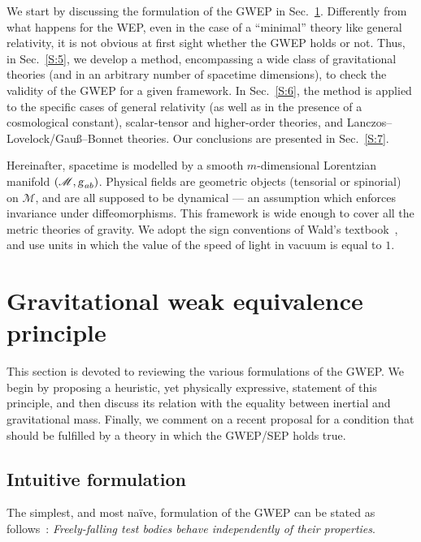 \documentclass[a4paper,showkeys,aps,prd,reprint,nofootinbib,showpacs,twocolumn]{revtex4-1}
\newcommand{\ton}[1]{\left(#1\right)}
\newcommand{\eq}[1]{\( #1 \)}
\newcommand{\Scr}[1]{\mathscr{#1}}
\newcommand{\matg}{\text{\textsl{g}}}%
\theoremstyle{plain}
\begin{document}
We start by discussing the formulation of the GWEP in Sec.~\ref{S:2}.  Differently from what happens for the WEP, even in the case of a ``minimal'' theory like general relativity, it is not obvious at first sight whether the GWEP holds or not.  Thus, in Sec.~\ref{S:5}, we develop a method, encompassing a wide class of gravitational theories (and in an arbitrary number of spacetime dimensions), to check the validity of the GWEP for a given framework.  In Sec.~\ref{S:6}, the method is applied to the specific cases of general relativity (as well as in the presence of a cosmological constant), scalar-tensor and higher-order theories, and Lanczos--Lovelock/Gau\ss{}--Bonnet theories.  Our conclusions are presented in Sec.~\ref{S:7}.

Hereinafter, spacetime is modelled by a smooth \eq{m}-dimensional  Lorentzian manifold \eq{\ton{\Scr{M} , \matg_{ab}}}.  Physical fields are geometric objects (tensorial or spinorial) on \eq{\Scr{M}}, and are all supposed to be dynamical --- an assumption which enforces invariance under diffeomorphisms.  This framework is wide enough to cover all the metric theories of gravity.  We adopt the sign conventions of Wald's textbook~\cite{Wald:1984rg}, and use units in which the value of the speed of light in vacuum is equal to \eq{1}.


\section{Gravitational weak equivalence principle}
\label{S:2}

This section is devoted to reviewing the various formulations of the GWEP.  We begin by proposing a heuristic, yet physically expressive, statement of this principle, and then discuss its relation with the equality between inertial and gravitational mass.  Finally, we comment on a recent proposal for a condition that should be fulfilled by a theory in which the GWEP/SEP holds true.


\subsection{Intuitive formulation}
\label{Ss:GWEP}

The simplest, and most na{\"i}ve, formulation of the GWEP can be stated as follows~\cite{will, will2006lr}: {\em Freely-falling test bodies behave independently of their properties}.
\end{document}
